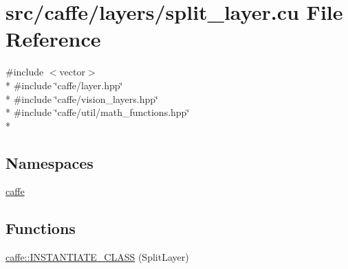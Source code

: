 \hypertarget{split__layer_8cu}{\section{src/caffe/layers/split\+\_\+layer.cu File Reference}
\label{split__layer_8cu}
}
{\ttfamily \#include $<$vector$>$}\\*
{\ttfamily \#include \char`\"{}caffe/layer.\+hpp\char`\"{}}\\*
{\ttfamily \#include \char`\"{}caffe/vision\+\_\+layers.\+hpp\char`\"{}}\\*
{\ttfamily \#include \char`\"{}caffe/util/math\+\_\+functions.\+hpp\char`\"{}}\\*
\subsection*{Namespaces}
\begin{DoxyCompactItemize}
\item 
 \hyperlink{namespacecaffe}{caffe}
\end{DoxyCompactItemize}
\subsection*{Functions}
\begin{DoxyCompactItemize}
\item 
\hyperlink{namespacecaffe_a760dd19eb7d418a3629ce7045fe56a6c}{caffe\+::\+I\+N\+S\+T\+A\+N\+T\+I\+A\+T\+E\+\_\+\+C\+L\+A\+S\+S} (Split\+Layer)
\end{DoxyCompactItemize}

